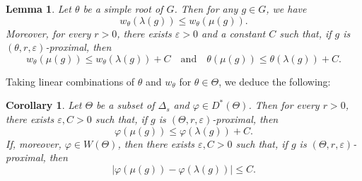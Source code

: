 \documentclass[11pt]{article}
\numberwithin{equation}{section}
\newcommand{\quand}{\quad\text{and}\quad}
\newtheorem{coro}[theo]{Corollary}
\newtheorem{lemma}[theo]{Lemma}
\theoremstyle{definition}
\let\epsilon\varepsilon
\let\phi\varphi
\begin{document}
\begin{lemma} \label{lem - ComparisonMuLambdaProximalElement}
Let $\theta$ be a simple root of $G$. Then for any $g\in G$, we have
\[w_\theta(\lambda(g)) \leq w_\theta(\mu(g)).\]
Moreover, for every $r>0$, there exists $\epsilon >0$ and a constant $C$ such that, if $g$ is $(\theta,r,\epsilon)$-proximal, then
\[w_\theta(\mu(g)) \leq w_\theta(\lambda(g)) + C\quand
\theta(\mu(g)) \leq \theta(\lambda(g)) + C.\]
\end{lemma}
Taking linear combinations of $\theta$ and $w_\theta$ for $\theta \in \Theta$, we deduce the following:
\begin{coro} \label{coro - ComparisonMuLambdaProximalElement}
Let $\Theta$ be a subset of $\Delta_s$ and $\phi \in D^*(\Theta)$. Then for every $r>0$, there exists $\epsilon, C>0$ such that, if $g$ is $(\Theta,r,\epsilon)$-proximal, then
\[\phi(\mu(g)) \leq \phi(\lambda(g)) + C.\]
If, moreover, $\phi \in W(\Theta)$, then there exists $\epsilon, C>0$ such that, if $g$ is $(\Theta,r,\epsilon)$-proximal, then
\[\vert \phi(\mu(g)) -\phi(\lambda(g))\vert \leq C.\]
\end{coro}
\end{document}
